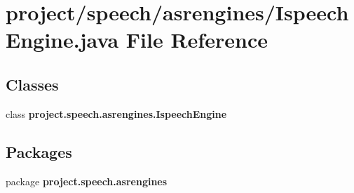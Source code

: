 \section{project/speech/asrengines/\+Ispeech\+Engine.java File Reference}
\label{_ispeech_engine_8java}
\subsection*{Classes}
\begin{DoxyCompactItemize}
\item 
class {\bf project.\+speech.\+asrengines.\+Ispeech\+Engine}
\end{DoxyCompactItemize}
\subsection*{Packages}
\begin{DoxyCompactItemize}
\item 
package {\bf project.\+speech.\+asrengines}
\end{DoxyCompactItemize}
